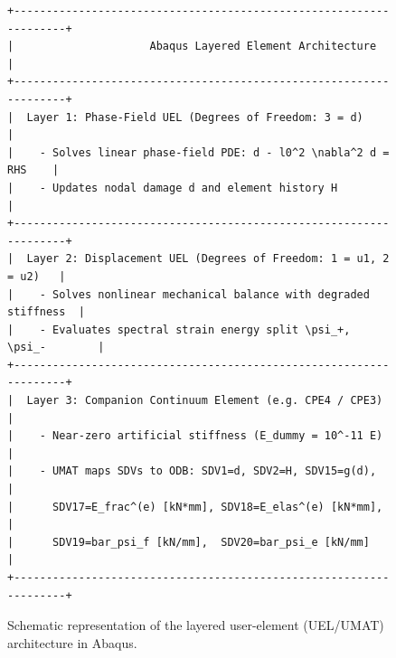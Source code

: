 \begin{figure}[htbp]
\centering
\small
\begin{verbatim}
+-------------------------------------------------------------------+
|                     Abaqus Layered Element Architecture          |
+-------------------------------------------------------------------+
|  Layer 1: Phase-Field UEL (Degrees of Freedom: 3 = d)             |
|    - Solves linear phase-field PDE: d - l0^2 \nabla^2 d = RHS    |
|    - Updates nodal damage d and element history H                 |
+-------------------------------------------------------------------+
|  Layer 2: Displacement UEL (Degrees of Freedom: 1 = u1, 2 = u2)   |
|    - Solves nonlinear mechanical balance with degraded stiffness  |
|    - Evaluates spectral strain energy split \psi_+, \psi_-        |
+-------------------------------------------------------------------+
|  Layer 3: Companion Continuum Element (e.g. CPE4 / CPE3)          |
|    - Near-zero artificial stiffness (E_dummy = 10^-11 E)         |
|    - UMAT maps SDVs to ODB: SDV1=d, SDV2=H, SDV15=g(d),          |
|      SDV17=E_frac^(e) [kN*mm], SDV18=E_elas^(e) [kN*mm],          |
|      SDV19=bar_psi_f [kN/mm],  SDV20=bar_psi_e [kN/mm]           |
+-------------------------------------------------------------------+
\end{verbatim}
\caption[Schematic representation of the layered user-element architecture in Abaqus.]{Schematic representation of the layered user-element (UEL/UMAT) architecture in Abaqus.}
\label{fig:uel_architecture_diagram}
\end{figure}

